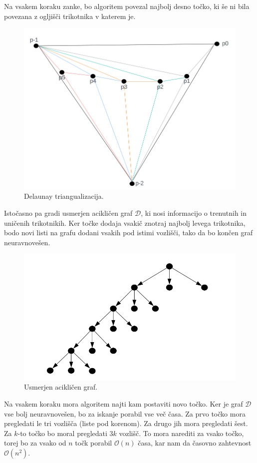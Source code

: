 \documentclass[fleqn]{article}
\begin{document}
Na vsakem koraku zanke, bo algoritem povezal najbolj desno točko, ki še ni bila povezana z ogljišči trikotnika v katerem je.

\begin{figure}[h!]
    \centering
    \includegraphics[width=0.7\linewidth]{triangulizacija.png}
    \caption{Delaunay triangualizacija.}
    \label{Delaunay}
\end{figure}

Istočasno pa gradi usmerjen acikličen graf $\mathcal{D}$, ki nosi informacijo o trenutnih in uničenih trikotnikih.
Ker točke dodaja vsakič znotraj najbolj levega trikotnika, bodo novi listi na grafu dodani vsakih pod istimi vozlišči, tako da bo končen graf neuravnovešen.

\begin{figure}[h!]
    \centering
    \includegraphics[width=0.7\linewidth]{graf.png}
    \caption{Usmerjen acikličen graf.}
    \label{graf}
\end{figure}

Na vsakem koraku mora algoritem najti kam postaviti novo točko. Ker je graf $\mathcal{D}$ vse bolj neuravnovešen, bo za iskanje porabil vse več časa.
Za prvo točko mora pregledati le tri vozlišča (liste pod korenom).
Za drugo jih mora pregledati šest.
Za $k$-to točko bo moral pregledati $3k$ vozlišč.
To mora narediti za vsako točko, torej bo za vsako od $n$ točk porabil $\mathcal{O} (n)$ časa, kar nam da časovno zahtevnost $\mathcal{O} (n^2)$.
\end{document}

